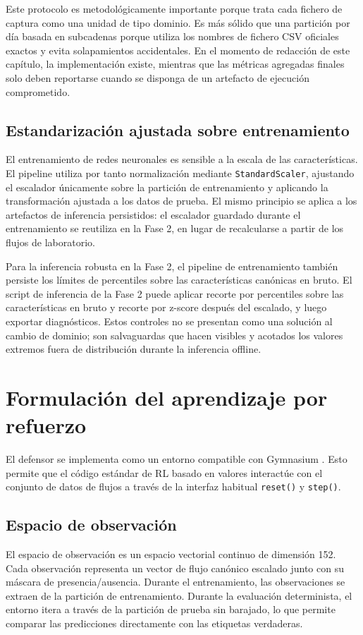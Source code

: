 Este protocolo es metodológicamente importante porque trata cada fichero de captura como una unidad de tipo dominio. Es más sólido que una partición por día basada en subcadenas porque utiliza los nombres de fichero CSV oficiales exactos y evita solapamientos accidentales. En el momento de redacción de este capítulo, la implementación existe, mientras que las métricas agregadas finales solo deben reportarse cuando se disponga de un artefacto de ejecución comprometido.

\subsection{Estandarización ajustada sobre entrenamiento}
El entrenamiento de redes neuronales es sensible a la escala de las características. El pipeline utiliza por tanto normalización mediante \texttt{StandardScaler}, ajustando el escalador únicamente sobre la partición de entrenamiento y aplicando la transformación ajustada a los datos de prueba. El mismo principio se aplica a los artefactos de inferencia persistidos: el escalador guardado durante el entrenamiento se reutiliza en la Fase 2, en lugar de recalcularse a partir de los flujos de laboratorio.

Para la inferencia robusta en la Fase 2, el pipeline de entrenamiento también persiste los límites de percentiles sobre las características canónicas en bruto. El script de inferencia de la Fase 2 puede aplicar recorte por percentiles sobre las características en bruto y recorte por z-score después del escalado, y luego exportar diagnósticos. Estos controles no se presentan como una solución al cambio de dominio; son salvaguardas que hacen visibles y acotados los valores extremos fuera de distribución durante la inferencia offline.

\section{Formulación del aprendizaje por refuerzo}
El defensor se implementa como un entorno compatible con Gymnasium \parencite{GymnasiumDocs}. Esto permite que el código estándar de RL basado en valores interactúe con el conjunto de datos de flujos a través de la interfaz habitual \texttt{reset()} y \texttt{step()}.

\subsection{Espacio de observación}
El espacio de observación es un espacio vectorial continuo de dimensión 152. Cada observación representa un vector de flujo canónico escalado junto con su máscara de presencia/ausencia. Durante el entrenamiento, las observaciones se extraen de la partición de entrenamiento. Durante la evaluación determinista, el entorno itera a través de la partición de prueba sin barajado, lo que permite comparar las predicciones directamente con las etiquetas verdaderas.

